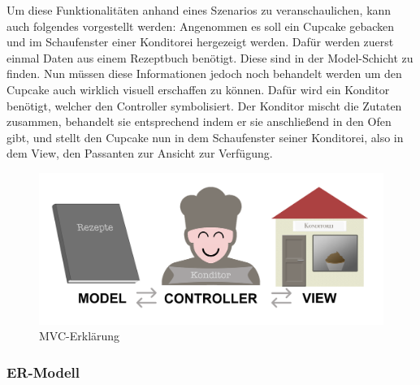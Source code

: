 Um diese Funktionalitäten anhand eines Szenarios zu veranschaulichen, kann auch folgendes vorgestellt werden:
Angenommen es soll ein Cupcake gebacken und im Schaufenster einer Konditorei hergezeigt werden. Dafür werden zuerst einmal Daten aus einem Rezeptbuch benötigt. Diese sind in der Model-Schicht zu finden.
Nun müssen diese Informationen jedoch noch behandelt werden um den Cupcake auch wirklich visuell erschaffen zu können. Dafür wird ein Konditor benötigt, welcher den Controller symbolisiert. 
Der Konditor mischt die Zutaten zusammen, behandelt sie entsprechend indem er sie anschließend in den Ofen gibt, und stellt den Cupcake nun in dem Schaufenster seiner Konditorei, also in dem View, den Passanten zur Ansicht zur Verfügung.
			\begin{figure}[H]
			\begin{centering}
			\includegraphics[width = 1\textwidth]{Bilder/Jok_mvc}
			\par\end{centering}
			\caption{MVC-Erklärung}
			\label{MVC-Erklärung}
			\end{figure}

    \subsubsection{ER-Modell}

